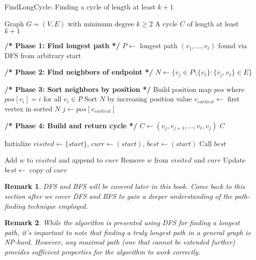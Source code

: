 \documentclass{article}
\newtheorem{remark}{Remark}
\theoremstyle{definition}
\begin{document}
\begin{algorithm}
\caption{FindLongCycle: Finding a cycle of length at least $k+1$}
\begin{algorithmic}[1]
\Require Graph $G = (V, E)$ with minimum degree $k \geq 2$
\Ensure A cycle $C$ of length at least $k+1$

    \State \textbf{/* Phase 1: Find longest path */}
    \State $P \gets$ longest path $(v_1,\ldots,v_\ell)$ found via DFS from arbitrary start
    
    \State \textbf{/* Phase 2: Find neighbors of endpoint */}
    \State $N \gets \{v_j \in P \setminus \{v_\ell\} : \{v_j, v_\ell\} \in E\}$
    
    \State \textbf{/* Phase 3: Sort neighbors by position */}
    \State Build position map $pos$ where $pos[v_i] = i$ for all $v_i \in P$
    \State Sort $N$ by increasing position value
    \State $v_{earliest} \gets$ first vertex in sorted $N$
    \State $j \gets pos[v_{earliest}]$
    
    \State \textbf{/* Phase 4: Build and return cycle */}
    \State $C \gets (v_j, v_{j+1}, \ldots, v_\ell, v_j)$
    \State \Return $C$ 
\EndFunction

    \State Initialize $visited \gets \{start\}$, $curr \gets (start)$, $best \gets (start)$
    \State Call 
    \State \Return $best$
\EndFunction

            \State Add $w$ to $visited$ and append to $curr$
            \State {}
            \State Remove $w$ from $visited$ and $curr$ 
        \EndIf
    \EndFor
        \State Update $best \gets$ copy of $curr$
    \EndIf
\EndFunction
\end{algorithmic}
\end{algorithm}

\begin{remark}
DFS and BFS will be covered later in this book. Come back to this section after we cover DFS and BFS to gain a deeper understanding of the path-finding technique employed.
\end{remark}

\begin{remark}
While the algorithm is presented using DFS for finding a longest path, it's important to note that finding a truly longest path in a general graph is NP-hard. However, any maximal path (one that cannot be extended further) provides sufficient properties for the algorithm to work correctly.
\end{remark}
\end{document}
